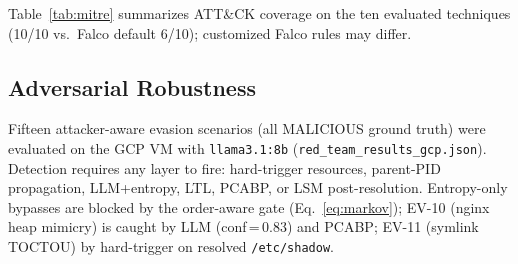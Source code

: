\documentclass[journal]{IEEEtran}
\begin{document}
Table~\ref{tab:mitre} summarizes ATT\&CK coverage on the ten evaluated
techniques (10/10 vs.\ Falco default 6/10); customized Falco rules may differ.

\subsection{Adversarial Robustness}\label{sec:adv}

Fifteen attacker-aware evasion scenarios (all MALICIOUS ground truth) were
evaluated on the GCP VM with \texttt{llama3.1:8b}
(\texttt{red\_team\_results\_gcp.json}).  Detection requires any layer to
fire: hard-trigger resources, parent-PID propagation, LLM+entropy, LTL, PCABP,
or LSM post-resolution.  Entropy-only bypasses are blocked by the order-aware
gate (Eq.~\eqref{eq:markov}); EV-10 (nginx heap mimicry) is caught by LLM
(conf\,=\,0.83) and PCABP; EV-11 (symlink TOCTOU) by hard-trigger on resolved
\texttt{/etc/shadow}.
\end{document}
